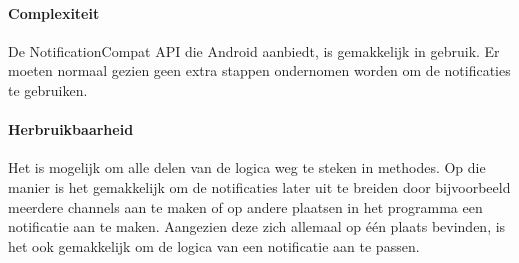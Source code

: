 \paragraph{Complexiteit}
De NotificationCompat API die Android aanbiedt, is gemakkelijk in gebruik. 
Er moeten normaal gezien geen extra stappen ondernomen worden om de notificaties 
te gebruiken.

\paragraph{Herbruikbaarheid}
Het is mogelijk om alle delen van de logica weg te steken in methodes. Op die manier 
is het gemakkelijk om de notificaties later uit te breiden door bijvoorbeeld meerdere channels aan te maken
of op andere plaatsen in het programma een notificatie aan te maken. 
Aangezien deze zich allemaal op één plaats bevinden, is het ook gemakkelijk om de logica
van een notificatie aan te passen.